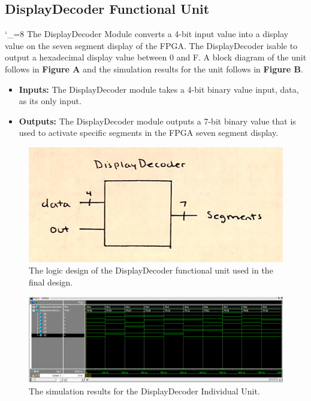 \documentclass[a4paper]{article}
\begin{document}
\subsection{DisplayDecoder Functional Unit}
\catcode`_=8
The DisplayDecoder Module converts a 4-bit input value into a display value on the seven segment display of the FPGA. The DisplayDecoder isable to output a hexadecimal display value between 0 and F. A block diagram of the unit follows in \textbf{Figure A} and the simulation results for the unit follows in \textbf{Figure B}.
\begin{itemize}
  \item \textbf{Inputs:  } The DisplayDecoder module takes a 4-bit binary value input, data, as its only input.
  \item \textbf{Outputs: } The DisplayDecoder module outputs a 7-bit binary value that is used to activate specific segments in the FPGA seven segment display.
\end{itemize}
\begin{figure}[h]
  \centering
    \includegraphics[width=.8\textwidth]{functional_units/DisplayDecoder/DisplayDecoder_symbol.png}
	\caption{The logic design of the DisplayDecoder functional unit used in the final design.}
    \label{fig:functional-1}
\end{figure}
\begin{figure}[h]
  \centering
\includegraphics[width=.98\textwidth]{functional_units/DisplayDecoder/DisplayDecoderTest.png}
	\caption{The simulation results for the DisplayDecoder Individual Unit.}
    \label{fig:top-level-sim}
\end{figure}
\end{document}
